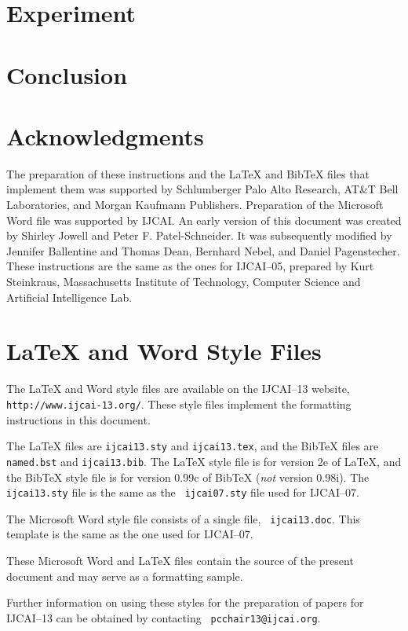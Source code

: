 \documentclass{article}
\begin{document}
\section{Experiment}

\section{Conclusion}

\section*{Acknowledgments}

The preparation of these instructions and the \LaTeX{} and Bib\TeX{}
files that implement them was supported by Schlumberger Palo Alto
Research, AT\&T Bell Laboratories, and Morgan Kaufmann Publishers.
Preparation of the Microsoft Word file was supported by IJCAI.  An
early version of this document was created by Shirley Jowell and Peter
F. Patel-Schneider.  It was subsequently modified by Jennifer
Ballentine and Thomas Dean, Bernhard Nebel, and Daniel Pagenstecher.
These instructions are the same as the ones for IJCAI--05, prepared by
Kurt Steinkraus, Massachusetts Institute of Technology, Computer
Science and Artificial Intelligence Lab.

\appendix

\section{\LaTeX{} and Word Style Files}\label{stylefiles}

The \LaTeX{} and Word style files are available on the IJCAI--13
website, {\tt http://www.ijcai-13.org/}.
These style files implement the formatting instructions in this
document.

The \LaTeX{} files are {\tt ijcai13.sty} and {\tt ijcai13.tex}, and
the Bib\TeX{} files are {\tt named.bst} and {\tt ijcai13.bib}. The
\LaTeX{} style file is for version 2e of \LaTeX{}, and the Bib\TeX{}
style file is for version 0.99c of Bib\TeX{} ({\em not} version
0.98i). The {\tt ijcai13.sty} file is the same as the {\tt
ijcai07.sty} file used for IJCAI--07.

The Microsoft Word style file consists of a single file, {\tt
ijcai13.doc}. This template is the same as the one used for
IJCAI--07.

These Microsoft Word and \LaTeX{} files contain the source of the
present document and may serve as a formatting sample.  

Further information on using these styles for the preparation of
papers for IJCAI--13 can be obtained by contacting {\tt
pcchair13@ijcai.org}.



\end{document}
